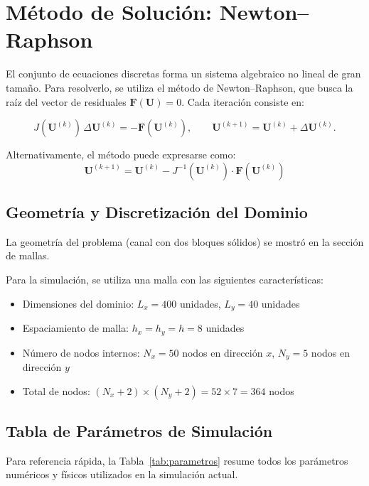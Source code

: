 \documentclass[11pt,letterpaper]{article}
\begin{document}
\section{Método de Solución: Newton--Raphson}

El conjunto de ecuaciones discretas forma un sistema algebraico no lineal de gran tamaño. Para resolverlo, se utiliza el método de Newton--Raphson, que busca la raíz del vector de residuales $\mathbf{F}(\mathbf{U})=0$. Cada iteración consiste en:

\[
J(\mathbf{U}^{(k)})\,\Delta \mathbf{U}^{(k)}=-\mathbf{F}(\mathbf{U}^{(k)}),\qquad
\mathbf{U}^{(k+1)}=\mathbf{U}^{(k)}+\Delta \mathbf{U}^{(k)}.
\]

Alternativamente, el método puede expresarse como:
\[
\mathbf{U}^{(k+1)} = \mathbf{U}^{(k)} - J^{-1}(\mathbf{U}^{(k)}) \cdot \mathbf{F}(\mathbf{U}^{(k)})
\]

\subsection{Geometría y Discretización del Dominio}

La geometría del problema (canal con dos bloques sólidos) se mostró en la sección de mallas.

Para la simulación, se utiliza una malla con las siguientes características:
\begin{itemize}
    \item Dimensiones del dominio: $L_x = 400$ unidades, $L_y = 40$ unidades
    \item Espaciamiento de malla: $h_x = h_y = h = 8$ unidades
    \item Número de nodos internos: $N_x = 50$ nodos en dirección $x$, $N_y = 5$ nodos en dirección $y$
    \item Total de nodos: $(N_x + 2) \times (N_y + 2) = 52 \times 7 = 364$ nodos
\end{itemize}

\subsection{Tabla de Parámetros de Simulación}

Para referencia rápida, la Tabla~\ref{tab:parametros} resume todos los parámetros numéricos y físicos utilizados en la simulación actual.
\end{document}
